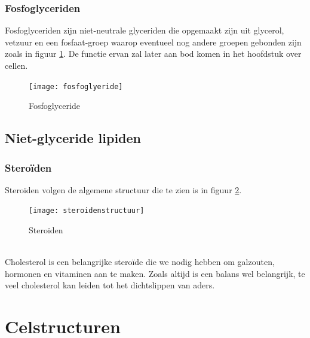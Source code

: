 \documentclass[a4paper,kul]{kulakarticle} %
\begin{document}
\subsubsection{Fosfoglyceriden}
Fosfoglyceriden zijn niet-neutrale glyceriden die opgemaakt zijn uit glycerol, vetzuur en een fosfaat-groep waarop eventueel nog andere groepen gebonden zijn zoals in figuur \ref{fig:fosfoglyeride}. De functie ervan zal later aan bod komen in het hoofdstuk over cellen. 
\begin{figure}[h]
	\centering
	\texttt{[image: fosfoglyeride]}
	\caption[Fosfoglyceride]{Fosfoglyceride}
	\label{fig:fosfoglyeride}
\end{figure}

\subsection{Niet-glyceride lipiden}
\subsubsection{Steroïden}
Steroïden volgen de algemene structuur die te zien is in figuur \ref{fig:steroidenstructuur}. 
\begin{figure}[h]
	\centering
	\texttt{[image: steroidenstructuur]}
	\caption[steroïden]{Steroïden}
	\label{fig:steroidenstructuur}
\end{figure}\\
Cholesterol is een belangrijke steroïde die we nodig hebben om galzouten, hormonen en vitaminen aan te maken. Zoals altijd is een balans wel belangrijk, te veel cholesterol kan leiden tot het dichtslippen van aders. 

\section{Celstructuren}
\end{document}
